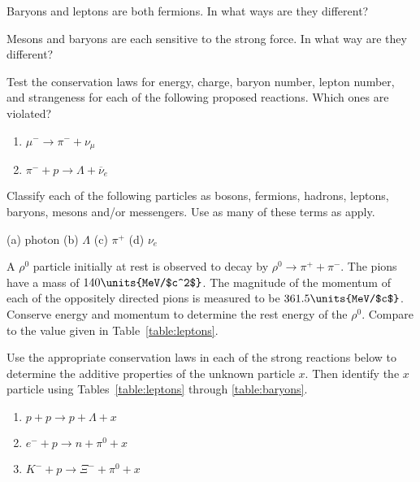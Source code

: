 \begin{problem}
Baryons and leptons are both fermions.  In what ways are they
  different?
\label{prob:baryons_vs_leptons}
\end{problem}

\begin{problem}
Mesons and baryons are each sensitive to the strong force.  In
  what way are they different?
\label{prob:mesons_vs_baryons}
\end{problem}

\begin{problem}
Test the conservation laws for energy, charge, baryon number,
  lepton number, and strangeness %
for each
  of the following proposed reactions.  Which ones are violated?
  \begin{enumerate}
  \item $\mu^- \to \pi^- + \nu_\mu$
  \item $\pi^- + p \to \Lambda + \overline\nu_e$
  \end{enumerate}
\label{prob:conservation_laws_i}
\end{problem}


\begin{problem}
Classify each of the following particles as bosons, fermions,
  hadrons, leptons, baryons, mesons and/or messengers.  Use as many of
  these terms as apply.\par\medskip
  (a) photon \qquad \qquad
  (b) $\Lambda$ \qquad \qquad
  (c) $\pi^+$ \qquad \qquad
  (d) $\nu_e$
\label{prob:classify_particles}
\end{problem}

\begin{problem}
A $\rho^0$ particle initially at rest is observed to decay by
  $\rho^0 \to \pi^+ + \pi^-$.  The pions have a mass of 
  $140\units{MeV/$c^2$}$.  The magnitude of the momentum of each 
  of the oppositely directed pions is measured to be 
  $361.5\units{MeV/$c$}$.  Conserve energy
  and momentum to determine the rest energy of the $\rho^0$.  Compare
  to the value given in Table~\ref{table:leptons}.
\label{prob:rho0_rest_energy}
\end{problem}

\begin{problem}
Use the appropriate conservation laws in each of the strong
  reactions below to determine the additive properties of the unknown
  particle $x$.  Then identify the $x$ particle using
  Tables~\ref{table:leptons} through \ref{table:baryons}.
  \begin{enumerate}
  \item $p + p \to p + \Lambda + x$
  \item $e^- + p \to n + \pi^0 + x$
  \item $K^- + p \to \Xi^- + \pi^0 + x$
  \end{enumerate}
\label{prob:identify_particle_x}
\end{problem}

